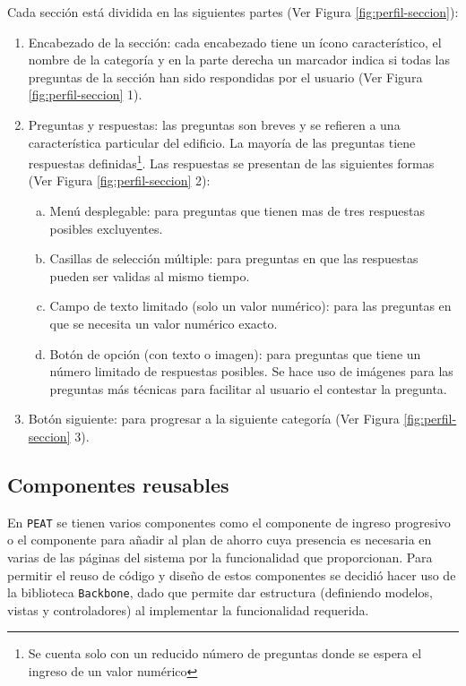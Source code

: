 Cada sección está dividida en las siguientes partes (Ver Figura
\ref{fig:perfil-seccion}):
\begin{enumerate}
\item Encabezado de la sección: cada encabezado tiene un ícono característico,
  el nombre de la categoría y en la parte derecha un marcador indica
  si todas las preguntas de la sección han sido respondidas por el usuario
  (Ver Figura \ref{fig:perfil-seccion} 1).
\item Preguntas y respuestas: las preguntas son breves y se refieren a una
  característica particular del edificio. La mayoría de las preguntas
  tiene respuestas definidas\footnote{Se cuenta solo con un reducido número de
    preguntas donde se espera el ingreso de un valor numérico}. Las respuestas se
  presentan de las siguientes formas (Ver Figura \ref{fig:perfil-seccion} 2):
  \begin{enumerate}[a)]
  \item Menú desplegable: para preguntas que tienen mas de tres respuestas
    posibles excluyentes.
  \item Casillas de selección múltiple: para preguntas en que las respuestas
    pueden ser validas al mismo tiempo.
  \item Campo de texto limitado (solo un valor numérico): para las preguntas
    en que se necesita un valor numérico exacto.
  \item Botón de opción (con texto o imagen): para preguntas que tiene un
    número limitado de respuestas posibles. Se hace uso de imágenes para las
    preguntas más técnicas para facilitar al usuario el contestar la pregunta.
  \end{enumerate}
\item Botón siguiente: para progresar a la siguiente categoría (Ver Figura \ref{fig:perfil-seccion} 3).
\end{enumerate}


\subsection{Componentes reusables}
\label{subsec:componentes}

En \texttt{PEAT} se tienen varios componentes como el componente de ingreso
progresivo o el componente para añadir al plan de ahorro cuya presencia es necesaria
en varias de las páginas del sistema por la funcionalidad que proporcionan.
Para permitir el reuso de código y diseño de estos componentes se decidió hacer uso
de la biblioteca \texttt{Backbone}, dado que permite dar estructura (definiendo
modelos, vistas y controladores) al implementar la funcionalidad requerida.

